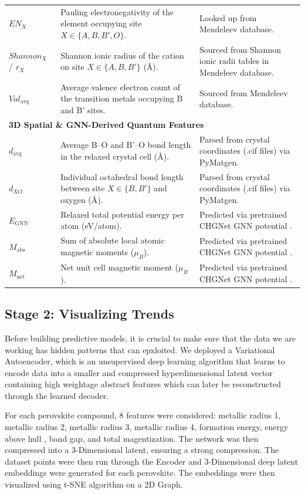 \documentclass[12pt,onecolumn]{elsarticle}
\begin{document}
\begin{longtable}{l p{} p{}}
$EN_X$ & Pauling electronegativity of the element occupying site $X \in \{A, B, B', O\}$. & Looked up from Mendeleev database. \\
\addlinespace
$Shannon_X$ / $r_X$ & Shannon ionic radius of the cation on site $X \in \{A, B, B'\}$ (\AA). & Sourced from Shannon ionic radii tables in Mendeleev database. \\
\addlinespace
$Val_{\text{avg}}$ & Average valence electron count of the transition metals occupying B and B' sites. & Sourced from Mendeleev database. \\
\midrule
\multicolumn{3}{l}{\textbf{3D Spatial \& GNN-Derived Quantum Features}} \\
\midrule
$d_{\text{avg}}$ & Average B--O and B'--O bond length in the relaxed crystal cell (\AA). & Parsed from crystal coordinates (.cif files) via PyMatgen. \\
\addlinespace
$d_{XO}$ & Individual octahedral bond length between site $X \in \{B, B'\}$ and oxygen (\AA). & Parsed from crystal coordinates (.cif files) via PyMatgen. \\
\addlinespace
$E_{\text{GNN}}$ & Relaxed total potential energy per atom (eV/atom). & Predicted via pretrained CHGNet GNN potential \cite{chgnet}. \\
\addlinespace
$M_{\text{abs}}$ & Sum of absolute local atomic magnetic moments ($\mu_B$). & Predicted via pretrained CHGNet GNN potential \cite{chgnet}. \\
\addlinespace
$M_{\text{net}}$ & Net unit cell magnetic moment ($\mu_B$). & Predicted via pretrained CHGNet GNN potential \cite{chgnet}. \\
\end{longtable}

\subsection{Stage 2: Visualizing Trends}
Before building predictive models, it is crucial to make sure that the data we are working has hidden patterns that can epxloited. We deployed a Variational Autoencoder, which is an unsupervised deep learning algorithm that learns to encode data into a smaller and compressed hyperdimensional latent vector containing high weightage abstract features which can later be reconstructed through the learned decoder.

For each perovskite compound, 8 features were considered: metallic radius 1, metallic radius 2, metallic radius 3, metallic radius 4, formation energy, energy above hull , band gap, and total magentization. The network was then compressed into a 3-Dimensional latent, ensuring a strong compression. The dataset points were then run through the Encoder and 3-Dimensional deep latent embeddings were generated for each perovskite. The embeddings were then visualized using t-SNE algorithm on a 2D Graph.
\end{document}
